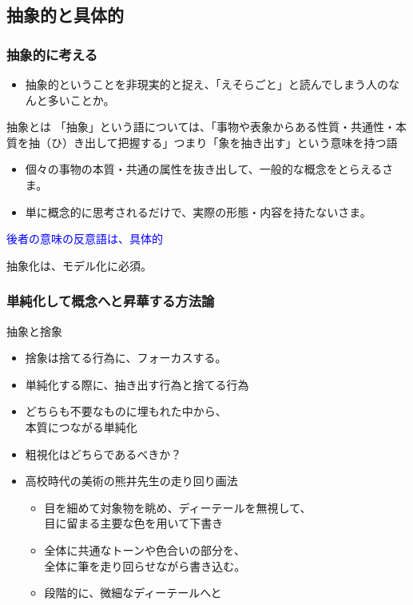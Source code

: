\documentclass[unicode,12pt]{beamer}%
\begin{document}
\subsection{抽象的と具体的}
\begin{frame}
    \frametitle{抽象的に考える}
        \begin{itemize}
            \item 抽象的ということを非現実的と捉え、「えそらごと」と読んでしまう人のなんと多いことか。
        \end{itemize}
    \begin{exampleblock}{抽象とは}
        「抽象」という語については、「事物や表象からある性質・共通性・本質を抽（ひ）き出して把握する」つまり「象を抽き出す」という意味を持つ語
        \begin{itemize}
            \item 個々の事物の本質・共通の属性を抜き出して、\alert{一般的な概念をとらえる}さま。
            \item 単に概念的に思考されるだけで、実際の形態・内容を持たないさま。
        \end{itemize}
        \textcolor{blue}{後者の意味の反意語は、具体的}
    \end{exampleblock}
    \large{\alert{抽象化は、モデル化に必須。}}
\end{frame}



\begin{frame}
    \frametitle{単純化して概念へと昇華する方法論}

            \begin{exampleblock}{抽象と捨象}
                \begin{itemize}
                    \item 捨象は捨てる行為に、フォーカスする。
                    \item 単純化する際に、抽き出す行為と捨てる行為
                    \item どちらも不要なものに埋もれた中から、\\本質につながる単純化
                    \item 粗視化はどちらであるべきか？
                    \item<2> 高校時代の美術の熊井先生の\alert{走り回り画法}
                    \begin{itemize}
                        \item<2> 目を細めて対象物を眺め、ディーテールを無視して、\\目に留まる主要な色を用いて下書き
                        \item<2> 全体に共通なトーンや色合いの部分を、\\\alert{全体に筆を走り回らせ}ながら書き込む。
                        \item<2> 段階的に、微細なディーテールへと
                    \end{itemize}
                \end{itemize}
            \end{exampleblock}
\end{frame}
\end{document}
